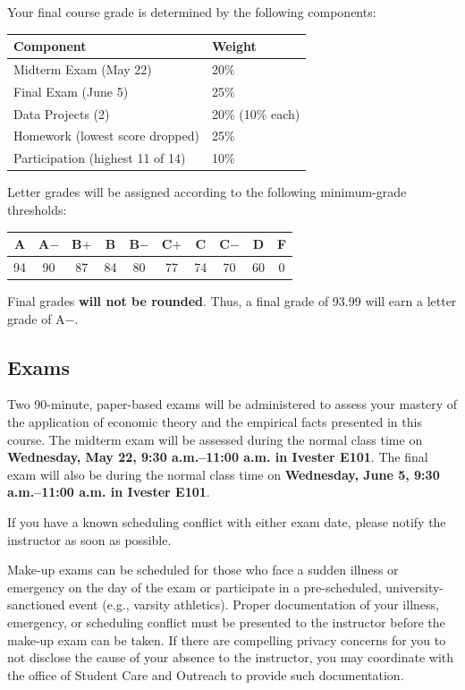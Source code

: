 Your final course grade is determined by the following components:

\begin{center}
\begin{tabular}{ll}
\toprule
Component & Weight \\
\midrule
Midterm Exam (May 22)            & 20\% \\
Final Exam (June 5)              & 25\% \\
Data Projects (2)                & 20\% (10\% each) \\
Homework (lowest score dropped)  & 25\% \\
Participation (highest 11 of 14) & 10\% \\
\bottomrule
\end{tabular}
\end{center}

Letter grades will be assigned according to the following minimum-grade thresholds:

\begin{center}
\begin{tabular}{*{10}{c}}
\toprule
A & A$-$ & B$+$ & B & B$-$ & C$+$ & C & C$-$ & D & F \\
\midrule
94 & 90 & 87 & 84 & 80 & 77 & 74 & 70 & 60 & 0 \\
\bottomrule
\end{tabular}
\end{center}

Final grades \textbf{will not be rounded}. Thus, a final grade of 93.99 will earn a letter grade of A$-$.

\subsection*{Exams}
Two 90-minute, paper-based exams will be administered to assess your mastery of the application of economic theory and the empirical facts presented in this course. The midterm exam will be assessed during the normal class time on \textbf{Wednesday, May 22, 9:30 a.m.--11:00 a.m. in Ivester E101}. The final exam will also be during the normal class time on \textbf{Wednesday, June 5, 9:30 a.m.--11:00 a.m. in Ivester E101}.

If you have a known scheduling conflict with either exam date, please notify the instructor as soon as possible.

Make-up exams can be scheduled for those who face a sudden illness or emergency on the day of the exam or participate in a pre-scheduled, university-sanctioned event (e.g., varsity athletics). Proper documentation of your illness, emergency, or scheduling conflict must be presented to the instructor before the make-up exam can be taken. If there are compelling privacy concerns for you to not disclose the cause of your absence to the instructor, you may coordinate with the office of Student Care and Outreach to provide such documentation.


